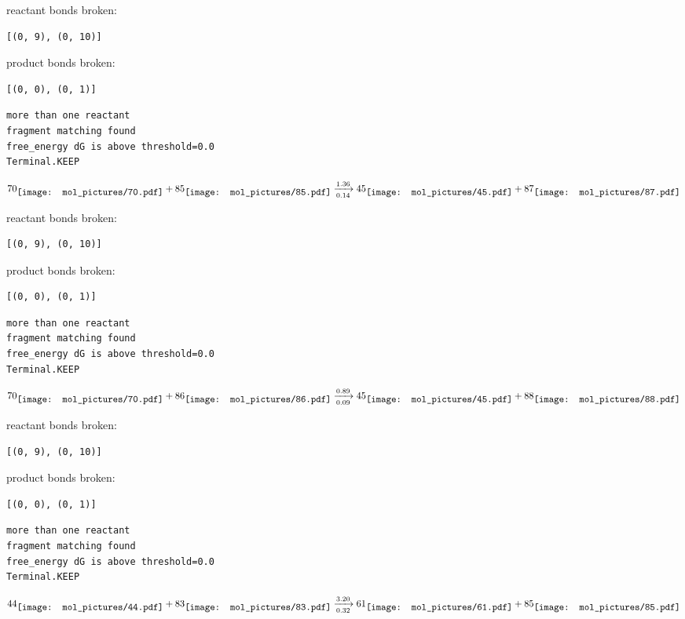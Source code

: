 \documentclass{article}
\begin{document}
reactant bonds broken:\begin{verbatim}
[(0, 9), (0, 10)]
\end{verbatim}
product bonds broken:\begin{verbatim}
[(0, 0), (0, 1)]
\end{verbatim}




\vspace{1cm}
\begin{verbatim}
more than one reactant
fragment matching found
free_energy dG is above threshold=0.0
Terminal.KEEP
\end{verbatim}
$$
70
\raisebox{-.5\height}{\texttt{[image: mol\_pictures/70.pdf]}}
+
85
\raisebox{-.5\height}{\texttt{[image: mol\_pictures/85.pdf]}}
\xrightarrow[0.14]{1.36}
45
\raisebox{-.5\height}{\texttt{[image: mol\_pictures/45.pdf]}}
+
87
\raisebox{-.5\height}{\texttt{[image: mol\_pictures/87.pdf]}}
$$


reactant bonds broken:\begin{verbatim}
[(0, 9), (0, 10)]
\end{verbatim}
product bonds broken:\begin{verbatim}
[(0, 0), (0, 1)]
\end{verbatim}




\vspace{1cm}
\begin{verbatim}
more than one reactant
fragment matching found
free_energy dG is above threshold=0.0
Terminal.KEEP
\end{verbatim}
$$
70
\raisebox{-.5\height}{\texttt{[image: mol\_pictures/70.pdf]}}
+
86
\raisebox{-.5\height}{\texttt{[image: mol\_pictures/86.pdf]}}
\xrightarrow[0.09]{0.89}
45
\raisebox{-.5\height}{\texttt{[image: mol\_pictures/45.pdf]}}
+
88
\raisebox{-.5\height}{\texttt{[image: mol\_pictures/88.pdf]}}
$$


reactant bonds broken:\begin{verbatim}
[(0, 9), (0, 10)]
\end{verbatim}
product bonds broken:\begin{verbatim}
[(0, 0), (0, 1)]
\end{verbatim}




\vspace{1cm}
\begin{verbatim}
more than one reactant
fragment matching found
free_energy dG is above threshold=0.0
Terminal.KEEP
\end{verbatim}
$$
44
\raisebox{-.5\height}{\texttt{[image: mol\_pictures/44.pdf]}}
+
83
\raisebox{-.5\height}{\texttt{[image: mol\_pictures/83.pdf]}}
\xrightarrow[0.32]{3.20}
61
\raisebox{-.5\height}{\texttt{[image: mol\_pictures/61.pdf]}}
+
85
\raisebox{-.5\height}{\texttt{[image: mol\_pictures/85.pdf]}}
$$
\end{document}

